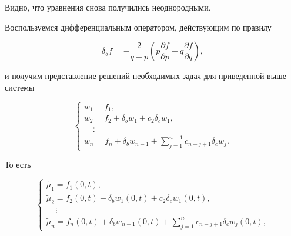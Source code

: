 Видно, что уравнения снова получились неоднородными.

Воспользуемся дифференциальным оператором, действующим по правилу

\begin{equation*}

\delta_bf=-\frac{2}{q-p}\left(p\frac{\partial f}{\partial p}-q\frac{\partial f}{\partial q}\right),

\end{equation*}

и получим представление решений необходимых задач для приведенной выше системы

\begin{equation*}

\left\{

  \begin{array}{l}

    w_1={f_1}, \\

    w_2={f_2}+\delta_b {w_1}+c_2\delta_c{w_1}, \\

~~~~~\vdots \\

    w_n={f_n}+\delta_b {w_{n-1}}+\sum_{j=1}^{n-1}{c_{n-j+1}\delta_c{w_{j}}}.

  \end{array}

\right.

\end{equation*}

То есть

\begin{equation}

\label{2:mu_JB}

\left\{

  \begin{array}{l}

    \tilde{\mu}_1={f_1(0,t)}, \\

    \tilde{\mu}_2={f_2(0,t)}+\delta_b w_1(0,t)+c_2\delta_c {w_1(0,t)}, \\

~~~~~\vdots \\

    \tilde{\mu}_n={f_n(0,t)}+\delta_b w_{n-1}(0,t)+\sum_{j=1}^{n}{c_{n-j+1}\delta_c{w_{j}(0,t)}},

  \end{array}

\right.

\end{equation}

